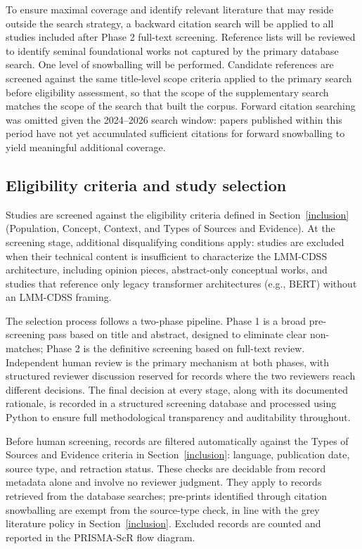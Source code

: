 \documentclass[review,12pt]{elsarticle}
\begin{document}
To ensure maximal coverage and identify relevant literature that may reside outside the search strategy, a backward citation search will be applied to all studies included after Phase 2 full-text screening. Reference lists will be reviewed to identify seminal foundational works not captured by the primary database search. One level of snowballing will be performed.  Candidate references are screened against the same title-level scope criteria applied to the primary search before eligibility assessment, so that the scope of the supplementary search matches the scope of the search that built the corpus. Forward citation searching was omitted given the 2024--2026 search window: papers published within this period have not yet accumulated sufficient citations for forward snowballing to yield meaningful additional coverage.


\subsection{Eligibility criteria and study selection}

 Studies are screened against the eligibility criteria defined in Section~\ref{inclusion} (Population, Concept, Context, and Types of Sources and Evidence). At the screening stage, additional disqualifying conditions apply: studies are excluded when their technical content is insufficient to characterize the LMM-CDSS architecture, including opinion pieces, abstract-only conceptual works, and studies that reference only legacy transformer architectures (e.g., BERT) without an LMM-CDSS framing.


The selection process follows a two-phase pipeline. Phase 1 is a broad pre-screening pass based on title and abstract, designed to eliminate clear non-matches; Phase 2 is the definitive screening based on full-text review. Independent human review is the primary mechanism at both phases, with structured reviewer discussion reserved for records where the two reviewers reach different decisions. The final decision at every stage, along with its documented rationale, is recorded in a structured screening database and processed using Python to ensure full methodological transparency and auditability throughout.

Before human screening, records are filtered automatically against the Types of Sources and Evidence criteria in Section~\ref{inclusion}: language, publication date, source type, and retraction status. These checks are decidable from record metadata alone and involve no reviewer judgment. They apply to records retrieved from the database searches; pre-prints identified through citation snowballing are exempt from the source-type check, in line with the grey literature policy in Section~\ref{inclusion}. Excluded records are counted and reported in the PRISMA-ScR flow diagram.
\end{document}
